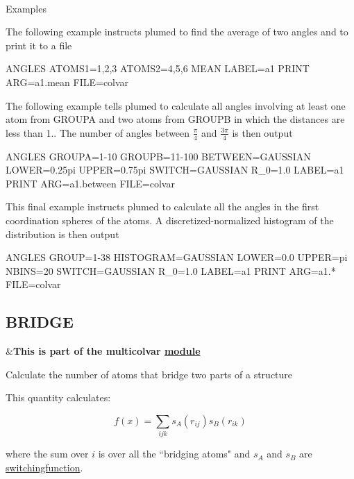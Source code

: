 \begin{TabularC}{2}
\\
\end{TabularC}


\begin{DoxyParagraph}{Examples}

\end{DoxyParagraph}
The following example instructs plumed to find the average of two angles and to print it to a file

\begin{DoxyVerb}ANGLES ATOMS1=1,2,3 ATOMS2=4,5,6 MEAN LABEL=a1
PRINT ARG=a1.mean FILE=colvar 
\end{DoxyVerb}


The following example tells plumed to calculate all angles involving at least one atom from G\+R\+O\+U\+P\+A and two atoms from G\+R\+O\+U\+P\+B in which the distances are less than 1.. The number of angles between $\frac{\pi}{4}$ and $\frac{3\pi}{4}$ is then output

\begin{DoxyVerb}ANGLES GROUPA=1-10 GROUPB=11-100 BETWEEN={GAUSSIAN LOWER=0.25pi UPPER=0.75pi} SWITCH={GAUSSIAN R_0=1.0} LABEL=a1
PRINT ARG=a1.between FILE=colvar
\end{DoxyVerb}


This final example instructs plumed to calculate all the angles in the first coordination spheres of the atoms. A discretized-\/normalized histogram of the distribution is then output

\begin{DoxyVerb}ANGLES GROUP=1-38 HISTOGRAM={GAUSSIAN LOWER=0.0 UPPER=pi NBINS=20} SWITCH={GAUSSIAN R_0=1.0} LABEL=a1
PRINT ARG=a1.* FILE=colvar
\end{DoxyVerb}
 \hypertarget{BRIDGE}{}\subsection{B\+R\+I\+D\+G\+E}\label{BRIDGE}
\begin{TabularC}{2}
\hline
&{\bfseries  This is part of the multicolvar \hyperlink{mymodules}{module }}   \\
\end{TabularC}
Calculate the number of atoms that bridge two parts of a structure

This quantity calculates\+:

\[ f(x) = \sum_{ijk} s_A(r_{ij})s_B(r_{ik}) \]

where the sum over $i$ is over all the ``bridging atoms" and $s_A$ and $s_B$ are \hyperlink{switchingfunction}{switchingfunction}.


